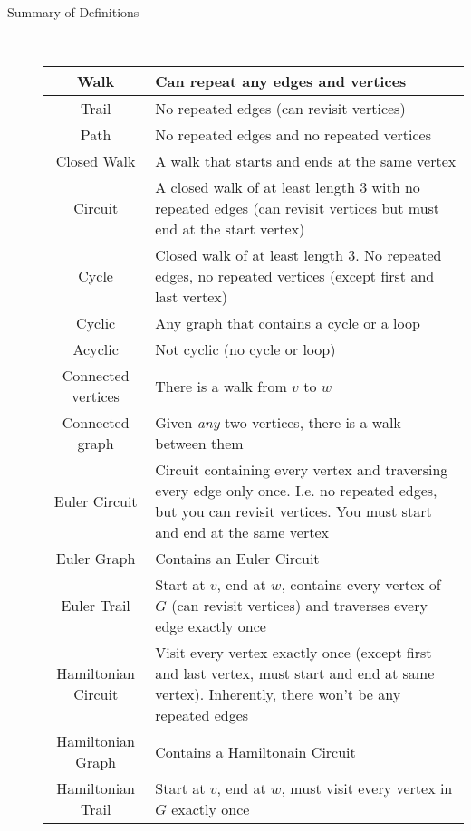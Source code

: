 \documentclass{article}
\begin{document}
\begin{description}
    
    \newpage
    
    \item[Summary of Definitions] \
	\begingroup
    \setlength{\tabcolsep}{6pt}
	\renewcommand{\arraystretch}{1.75} 
	\begin{table}[H]
		\centering
		\begin{tabular}{|c|p{4in}|}
			\hline 
			Walk & \hfil Can repeat any edges and vertices \\
			\hline
			Trail & \hfil No repeated edges (can revisit vertices) \\
			\hline
			Path & \hfil No repeated edges and no repeated vertices \\ 
			\hline
			Closed Walk & \hfil A walk that starts and ends at the same vertex \\
			\hline
			Circuit & A closed walk of at least length 3 with no repeated edges (can revisit vertices but must end at the start vertex) \\ 
			\hline
			Cycle & Closed walk of at least length 3. No repeated edges, no repeated vertices (except first and last vertex) \\
			\hline
			Cyclic & \hfil Any graph that contains a cycle or a loop \\
			\hline
			Acyclic & \hfil Not cyclic (no cycle or loop) \\
			\hline
			Connected vertices & \hfil There is a walk from $v$ to $w$ \\
			\hline
			Connected graph & \hfil Given \emph{any} two vertices, there is a walk between them \\
			\hline
			Euler Circuit & Circuit containing every vertex and traversing every edge only once. I.e. no repeated edges, but you can revisit vertices. You must start and end at the same vertex \\
			\hline
			Euler Graph & \hfil Contains an Euler Circuit \\
			\hline
			Euler Trail & Start at $v$, end at $w$, contains every vertex of $G$ (can revisit vertices) and traverses every edge exactly once \\
			\hline
			Hamiltonian Circuit & Visit every vertex exactly once (except first and last vertex, must start and end at same vertex). Inherently, there won't be any repeated edges  \\
			\hline 
			Hamiltonian Graph & \hfil Contains a Hamiltonain Circuit \\ 
			\hline
			Hamiltonian Trail & \hfil Start at $v$, end at $w$, must visit every vertex in $G$ exactly once \\

\end{tabular}
\end{table}
\end{description}
\end{document}
